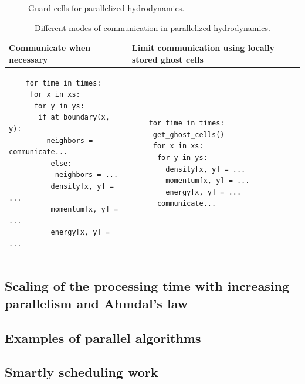 
\begin{figure}[!htb]
    \centering
    
    \caption{Guard cells for parallelized hydrodynamics.}
    \label{fig:parallel_ncell}
\end{figure}


\begin{table}
    \centering
    \begin{tabular}{|p{}|p{}|}
        \hline
        \textcolor{red1}{Communicate when necessary} & \textcolor{green1}{Limit communication using locally stored ghost cells} \\
        \hline
        \begin{minipage}[t]{0.45\textwidth}
            \begin{verbatim}
    for time in times:
     for x in xs:
      for y in ys:
       if at_boundary(x, y):
         neighbors = communicate...
          else:
           neighbors = ...
          density[x, y] = ...
          momentum[x, y] = ...
          energy[x, y] = ...
            \end{verbatim}
        \end{minipage}
         & \begin{minipage}[t]{0.45\textwidth}
            \begin{verbatim}
    for time in times:
     get_ghost_cells()
     for x in xs:
      for y in ys:
        density[x, y] = ...
        momentum[x, y] = ...
        energy[x, y] = ...
      communicate...
        \end{verbatim}
         \end{minipage} \\
        \hline
    \end{tabular}
    \caption{Different modes of communication in parallelized hydrodynamics.}
    \label{tab:parallel_ncell}
\end{table}


\subsection{Scaling of the processing time with increasing parallelism and Ahmdal's law}

\subsection{Examples of parallel algorithms}

\subsection{Smartly scheduling work}


